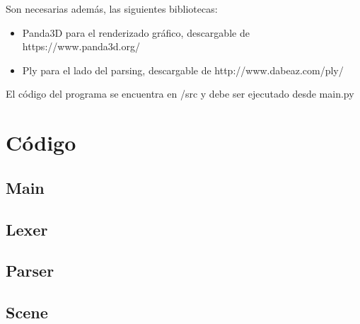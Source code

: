 \documentclass[a4paper, 10pt, twoside]{article}
\begin{document}
Son necesarias además, las siguientes bibliotecas:
\begin{itemize}
\item Panda3D para el renderizado gráfico, descargable de https://www.panda3d.org/
\item Ply para el lado del parsing, descargable de http://www.dabeaz.com/ply/
\end{itemize}

El código del programa se encuentra en /src y debe ser ejecutado desde main.py

\section{Código}

\subsection{Main}

\begin{small}

\end{small}


\subsection{Lexer}

\begin{small}

\end{small}

\subsection{Parser}

\begin{small}

\end{small}

\subsection{Scene}

\begin{small}

\end{small}
\end{document}
